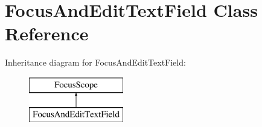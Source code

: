 \hypertarget{classFocusAndEditTextField}{\section{Focus\-And\-Edit\-Text\-Field Class Reference}
\label{classFocusAndEditTextField}
}
Inheritance diagram for Focus\-And\-Edit\-Text\-Field\-:\begin{figure}[H]
\begin{center}
\leavevmode
\includegraphics[height=2.000000cm]{classFocusAndEditTextField}
\end{center}
\end{figure}
